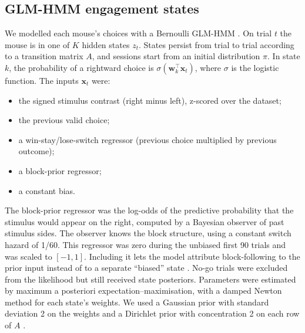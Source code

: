 \documentclass[11pt]{article}
\begin{document}
\subsection{GLM-HMM engagement states}
We modelled each mouse's choices with a Bernoulli GLM-HMM \citep{ashwood2022}. On trial $t$ the mouse is in one of $K$ hidden states $z_t$. States persist from trial to trial according to a transition matrix $A$, and sessions start from an initial distribution $\pi$. In state $k$, the probability of a rightward choice is $\sigma(\mathbf{w}_k^\top \mathbf{x}_t)$, where $\sigma$ is the logistic function. The inputs $\mathbf{x}_t$ were:
\begin{itemize}
\item the signed stimulus contrast (right minus left), z-scored over the dataset;
\item the previous valid choice;
\item a win-stay/lose-switch regressor (previous choice multiplied by previous outcome);
\item a block-prior regressor;
\item a constant bias.
\end{itemize}
The block-prior regressor was the log-odds of the predictive probability that the stimulus would appear on the right, computed by a Bayesian observer of past stimulus sides. The observer knows the block structure, using a constant switch hazard of 1/60. This regressor was zero during the unbiased first 90 trials and was scaled to $[-1,1]$. Including it lets the model attribute block-following to the prior input instead of to a separate ``biased'' state \citep[cf.][]{mohammadi2025}. No-go trials were excluded from the likelihood but still received state posteriors. Parameters were estimated by maximum a posteriori expectation--maximisation, with a damped Newton method for each state's weights. We used a Gaussian prior with standard deviation 2 on the weights and a Dirichlet prior with concentration 2 on each row of $A$ \citep{ashwood2022}.
\end{document}
